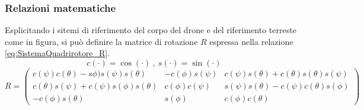 \subsubsection{Relazioni matematiche}
Esplicitando i sitemi di riferimento del corpo del drone e del riferimento terreste come in  figura, si può definire la matrice di rotazione $R$ espressa nella relazione \ref{eq:SistemaQuadrirotore_R}.
\[ 	c(\cdot)=\cos(\cdot)\ ,\  s(\cdot) = \sin(\cdot) \]
\begin{equation}
R=
	\begin{pmatrix}
	c(\psi)c(\theta)-s\phi)s(\psi)s(\theta) & -c(\phi)s(\psi) & c(\psi)s(\theta)+c(\theta)s(\theta)s(\psi) \\ 
	c(\theta) s(\psi)+c(\psi)s(\phi)s(\theta) & c(\phi)c(\psi) & s(\psi)s(\theta)-c(\psi)c(\theta)s(\phi) \\ 
	-c(\phi)s(\theta)	& s(\phi) & c(\phi)c(\theta)
	\end{pmatrix}
	\label{eq:SistemaQuadrirotore_R}
\end{equation}

